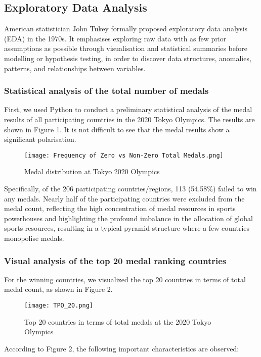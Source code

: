 \documentclass[11pt,twoside]{article}
\numberwithin{Theorem}{section}
\numberwithin{Definition}{section}
\numberwithin{Lemma}{section}
\numberwithin{Algorithm}{section}
\numberwithin{equation}{section}
\begin{document}
\subsection{Exploratory Data Analysis}
American statistician John Tukey formally proposed exploratory data analysis (EDA) in the 1970s. It emphasises exploring raw data with as few prior assumptions as possible through visualisation and statistical summaries before modelling or hypothesis testing, in order to discover data structures, anomalies, patterns, and relationships between variables.
\subsubsection{Statistical analysis of the total number of medals}
First, we used Python to conduct a preliminary statistical analysis of the medal results of all participating countries in the 2020 Tokyo Olympics. The results are shown in Figure 1. It is not difficult to see that the medal results show a significant polarisation.

\begin{figure}[!ht]
\centering
\texttt{[image: Frequency of Zero vs Non-Zero Total Medals.png]}
\caption{Medal distribution at Tokyo 2020 Olympics}
\end{figure}

Specifically, of the 206 participating countries/regions, 113 (54.58\%) failed to win any medals.
Nearly half of the participating countries were excluded from the medal count, reflecting the high concentration of medal resources in sports powerhouses and highlighting the profound imbalance in the allocation of global sports resources, resulting in a typical pyramid structure where a few countries monopolise medals.



\subsubsection{Visual analysis of the top 20 medal ranking countries}
For the winning countries, we visualized the top 20 countries in terms of total medal count, as shown in Figure 2.

\begin{figure}[!ht]
\centering
\texttt{[image: TPO\_20.png]}
\caption{Top 20 countries in terms of total medals at the 2020 Tokyo Olympics}
\end{figure}


According to Figure 2, the following important characteristics are observed:
\end{document}
